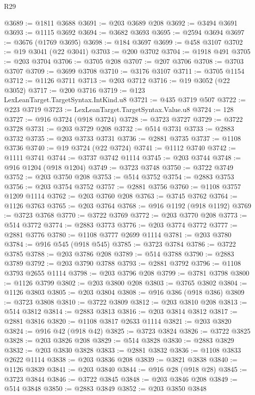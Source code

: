 \begin{lexlean}{R29}
\begin{coremodule}
@3689 := @1811 @3688
@3691 := @203 @3689 @208
@3692 := @3494 @3691
@3693 := @1115 @3692
@3694 := @3682 @3693
@3695 := @2594 @3694
@3697 := @3676 (@1769 @3695)
@3698 := @184 @3697
@3699 := @458 @3107
@3702 := @19 @3041 (@22 @3041)
@3703 := @200 @3702
@3704 := @1918 @491
@3705 := @203 @3704
@3706 := @3705 @208
@3707 := @207 @3706
@3708 := @3703 @3707
@3709 := @3699 @3708
@3710 := @3176 @3107
@3711 := @3705 @1154
@3712 := @1126 @3711
@3713 := @203 @3712
@3716 := @19 @3052 (@22 @3052)
@3717 := @200 @3716
@3719 := @123 LexLeanTarget.TargetSyntax.IntKind.u8
@3721 := @435 @3719 @507
@3722 := @223 @3719
@3723 := LexLeanTarget.TargetSyntax.Value.u8
@3724 := 128
@3727 := @916 @3724 (@918 @3724)
@3728 := @3723 @3727
@3729 := @3722 @3728
@3731 := @203 @3729 @208
@3732 := @514 @3731
@3733 := @2883 @3732
@3735 := @203 @3733 @3731
@3736 := @2881 @3735
@3737 := @1108 @3736
@3740 := @19 @3724 (@22 @3724)
@3741 := @1112 @3740
@3742 := @1111 @3741
@3744 := @3737 @3742 @1114
@3745 := @203 @3744
@3748 := @916 @1204 (@918 @1204)
@3749 := @3723 @3748
@3750 := @3722 @3749
@3752 := @203 @3750 @208
@3753 := @514 @3752
@3754 := @2883 @3753
@3756 := @203 @3754 @3752
@3757 := @2881 @3756
@3760 := @1108 @3757 @1209 @1114
@3762 := @203 @3760 @208
@3763 := @3745 @3762
@3764 := @1126 @3763
@3765 := @203 @3764
@3768 := @916 @1192 (@918 @1192)
@3769 := @3723 @3768
@3770 := @3722 @3769
@3772 := @203 @3770 @208
@3773 := @514 @3772
@3774 := @2883 @3773
@3776 := @203 @3774 @3772
@3777 := @2881 @3776
@3780 := @1108 @3777 @2699 @1114
@3781 := @203 @3780
@3784 := @916 @545 (@918 @545)
@3785 := @3723 @3784
@3786 := @3722 @3785
@3788 := @203 @3786 @208
@3789 := @514 @3788
@3790 := @2883 @3789
@3792 := @203 @3790 @3788
@3793 := @2881 @3792
@3796 := @1108 @3793 @2655 @1114
@3798 := @203 @3796 @208
@3799 := @3781 @3798
@3800 := @1126 @3799
@3802 := @203 @3800 @208
@3803 := @3765 @3802
@3804 := @1126 @3803
@3805 := @203 @3804
@3808 := @916 @386 (@918 @386)
@3809 := @3723 @3808
@3810 := @3722 @3809
@3812 := @203 @3810 @208
@3813 := @514 @3812
@3814 := @2883 @3813
@3816 := @203 @3814 @3812
@3817 := @2881 @3816
@3820 := @1108 @3817 @2633 @1114
@3821 := @203 @3820
@3824 := @916 @42 (@918 @42)
@3825 := @3723 @3824
@3826 := @3722 @3825
@3828 := @203 @3826 @208
@3829 := @514 @3828
@3830 := @2883 @3829
@3832 := @203 @3830 @3828
@3833 := @2881 @3832
@3836 := @1108 @3833 @2622 @1114
@3838 := @203 @3836 @208
@3839 := @3821 @3838
@3840 := @1126 @3839
@3841 := @203 @3840
@3844 := @916 @28 (@918 @28)
@3845 := @3723 @3844
@3846 := @3722 @3845
@3848 := @203 @3846 @208
@3849 := @514 @3848
@3850 := @2883 @3849
@3852 := @203 @3850 @3848

\end{coremodule}
\end{lexlean}
